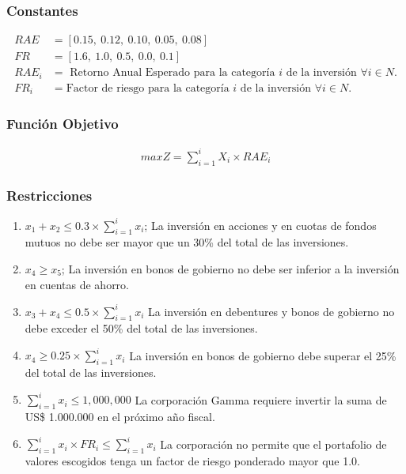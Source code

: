 \documentclass[a4paper,12pt]{article}
\begin{document}
\subsubsection{Constantes}
\begin{equation*}
\begin{split}
	RAE &= [0.15,\ 0.12,\ 0.10,\ 0.05,\ 0.08] \\
	FR & = [1.6,\ 1.0,\ 0.5,\ 0.0,\ 0.1] \\
	RAE_i &= \text{ Retorno Anual Esperado para la categoría } i \text{ de la inversión } \forall i \in N. \\
	FR_i &= \text{Factor de riesgo para la categoría } i \text{ de la inversión } \forall i \in N.
\end{split}
\end{equation*}
\subsubsection{Función Objetivo}
\begin{equation*}
\begin{split}
	maxZ = \sum_{i = 1}^{i}X_i\times RAE_i
\end{split}
\end{equation*}
\subsubsection{Restricciones}
\begin{enumerate}
	\item $x_1 + x_2 \leq 0.3\times\sum_{i = 1}^{i}x_i$; La inversión en acciones y en cuotas de fondos mutuos no debe ser mayor que un
	30\% del total de  las  inversiones.
	\item $x_4 \geq x_5$; La  inversión  en  bonos  de  gobierno  no  debe  ser  inferior  a  la  inversión  en  cuentas  de  ahorro.
	\item $x_3 + x_4 \leq 0.5\times\sum_{i = 1}^{i}x_i$ La inversión en debentures y bonos de gobierno no debe exceder el 50\% del total de las inversiones.
	\item $x_4 \geq 0.25\times\sum_{i = 1}^{i}x_i$ La 
	inversión en bonos de gobierno debe superar el 25\%	del total de las inversiones.
	\item $\sum_{i = 1}^{i}x_i \leq 1,000,000$ La corporación Gamma    requiere invertir  la  suma  de  US\$  1.000.000  en el  próximo  año  fiscal. 
	\item $\sum_{i = 1}^{i}x_i\times FR_i \leq \sum_{i = 1}^{i}x_i$  La  corporación  no  permite  que el  portafolio  de  valores  escogidos  tenga  un  factor de  riesgo ponderado mayor que 1.0. 
\end{enumerate}
\end{document}
